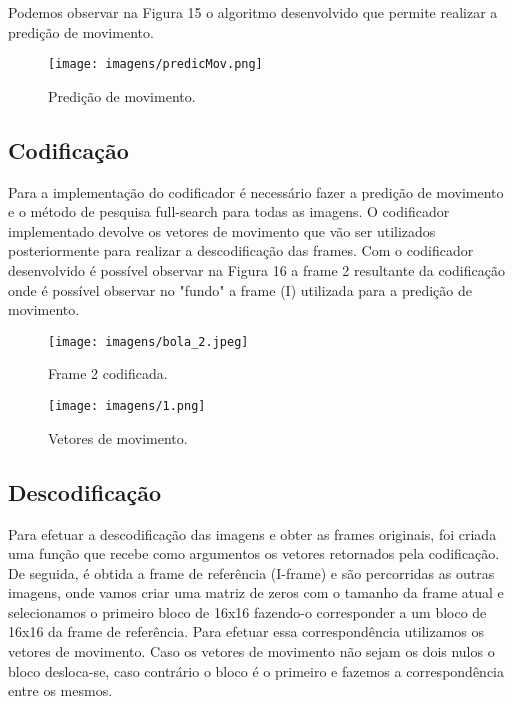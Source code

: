 \documentclass[12pt,a4paper]{article}
\begin{document}
Podemos observar na Figura 15 o algoritmo desenvolvido que permite realizar a predição de movimento.

\begin{figure}[h]
\texttt{[image: imagens/predicMov.png]}
\centering
\caption{Predição de movimento.}
\end{figure}

\subsection{Codificação}
Para a implementação do codificador é necessário fazer a predição de movimento e o método de pesquisa full-search para todas as imagens. O codificador implementado devolve os vetores de movimento que vão ser utilizados posteriormente para realizar a descodificação das frames. Com o codificador desenvolvido é possível observar na Figura 16 a frame 2 resultante da codificação onde é possível observar no "fundo" a frame (I) utilizada para a predição de movimento. 

\begin{figure}[h]
	\centering
    \begin{minipage}{0.4\textwidth}
        \centering
        \texttt{[image: imagens/bola\_2.jpeg]}
        \caption{Frame 2 codificada.}
    \end{minipage}\hfill
    \begin{minipage}{0.4\textwidth}
        \centering
        \texttt{[image: imagens/1.png]}
        \caption{Vetores de movimento.}
    \end{minipage}
\end{figure}
\newpage
\subsection{Descodificação}
Para efetuar a descodificação das imagens e obter as frames originais, foi criada uma função que recebe como argumentos os vetores retornados pela codificação. De seguida, é obtida a frame de referência (I-frame) e são percorridas as outras imagens, onde vamos criar uma matriz de zeros com o tamanho da frame atual e selecionamos o primeiro bloco de 16x16 fazendo-o corresponder a um bloco de 16x16 da frame de referência. Para efetuar essa correspondência utilizamos os vetores de movimento. Caso os vetores de movimento não sejam os dois nulos o bloco desloca-se, caso contrário o bloco é o primeiro e fazemos a correspondência entre os mesmos.
\end{document}
